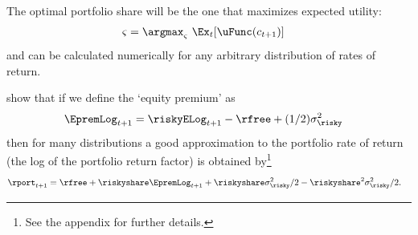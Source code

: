 The optimal portfolio share will be the one that maximizes expected utility:
\begin{equation}\begin{gathered}\begin{aligned}
  \varsigma & =  \argmax_{\varsigma} ~ \Ex_{t}[\uFunc(c_{t+1})]
\end{aligned}\end{gathered}\end{equation}
and can be calculated numerically for any arbitrary distribution of rates of return.

\cite{cvAppendix} show that if we define the `equity premium' as
\begin{equation}\begin{gathered}\begin{aligned}
  \EpremLog_{t+1} & =  \riskyELog_{t+1}-\rfree + (1/2)\sigma^{2}_{\risky} \label{eq:eprem}
\end{aligned}\end{gathered}\end{equation}
then for many distributions a good approximation to the portfolio rate of return (the log of the portfolio return factor) is obtained by\footnote{See the appendix for further details.}
\begin{equation}\begin{gathered}\begin{aligned}
  \rport_{t+1} & =  \rfree+ \riskyshare \EpremLog_{t+1}+\riskyshare \sigma^{2}_{\risky}/2 - \riskyshare^{2}\sigma^{2}_{\risky}/2 \label{eq:rportCV}.
\end{aligned}\end{gathered}\end{equation}

